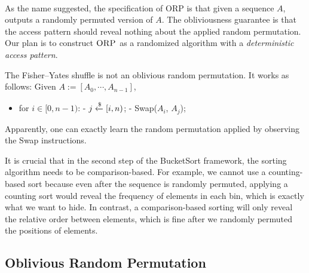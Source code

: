 $ $

As the name suggested, the specification of \textsc{ORP} is that given a sequence $A$, outputs a randomly permuted version of $A$. The obliviousness guarantee is that the access pattern should reveal nothing about the applied random permutation. Our plan is to construct $\textsc{ORP}$ as a randomized algorithm with a \emph{deterministic access pattern}.

\begin{nonexample}
    The Fisher–Yates shuffle is not an oblivious random permutation. It works as follows: Given $A := [A_0, \cdots, A_{n-1}]$,
    \begin{itemize}
        \item for $i \in [0, n-1)$:
        \subitem - $j \xleftarrow{\$}  [i, n)$;
        \subitem - Swap($A_i$, $A_j$);
    \end{itemize}
    Apparently, one can exactly learn the random permutation applied by observing the Swap instructions. 
\end{nonexample}

\begin{remark}
    It is crucial that in the second step of the BucketSort framework, the sorting algorithm needs to be comparison-based. For example, we cannot use a counting-based sort because even after the sequence is randomly permuted, applying a counting sort would reveal the frequency of elements in each bin, which is exactly what we want to hide. In contrast, a comparison-based sorting will only reveal the relative order between elements, which is fine after we randomly permuted the positions of elements.
\end{remark}

\subsection{Oblivious Random Permutation}

